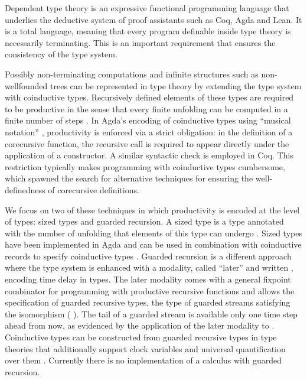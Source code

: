 Dependent type theory is an expressive functional programming
language that underlies the deductive system of proof assistants such
as Coq, Agda \cite{norell} and Lean.  It is a total language,
meaning that every program definable inside type theory is necessarily
terminating. This is an important requirement that ensures the
consistency of the type system. 

Possibly non-terminating computations
and infinite structures such as non-wellfounded trees can be
represented in type theory by extending the type system with
coinductive types. Recursively defined elements of these types
are required to be productive in the sense that every
finite unfolding can be computed in a finite number of steps \cite{Coquand93}.
In Agda's encoding of coinductive types using ``musical notation''
\cite{DA10}, productivity is enforced via a strict obligation: in the
definition of a corecursive function, the recursive
call is required to appear directly under
the application of a constructor. A similar syntactic
check is employed in Coq.
This restriction
typically makes programming with coinductive types cumbersome,
which spawned the search for alternative techniques for ensuring the
well-definedness of corecursive definitions.

We focus on two of these techniques in which productivity is encoded
at the level of types: sized types and guarded recursion. A sized type
 is a type annotated with the number of unfolding that
elements of this type can undergo \cite{Hughes96}. Sized types have been implemented
in Agda and can be used in
combination with coinductive records to specify
coinductive types \cite{Copatterns,AVW-normalization}.  Guarded recursion \cite{Nakano}
is a different approach where the type system is enhanced with a
modality, called ``later'' and written , encoding time delay in
types. The later modality comes with a general fixpoint combinator for
programming with productive recursive functions and allows the
specification of guarded recursive types, \eg the type of guarded
streams satisfying the isomorphism     
 ( ). The tail of a guarded stream is available only
one time step ahead from now, as evidenced by the application of the
later modality to  . Coinductive types can be constructed
from guarded recursive types in type theories that additionally
support clock variables and universal quantification over them
\cite{atkey2013productive,BahrGM17}. Currently there is no
implementation of a calculus with guarded recursion.

